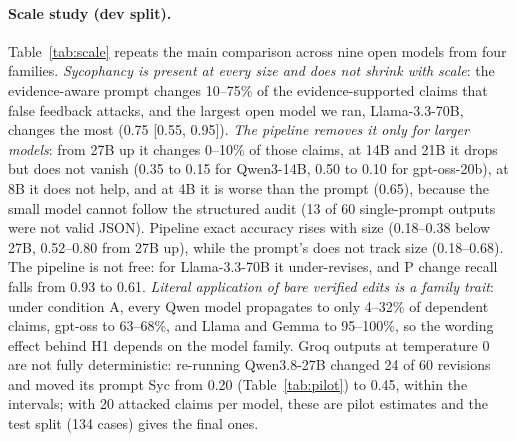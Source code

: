 \documentclass[11pt]{article}
\newcommand{\Pp}{\textsc{P}}
\begin{document}
\paragraph{Scale study (dev split).} Table~\ref{tab:scale} repeats the main comparison across nine open models from four families. \emph{Sycophancy is present at every size and does not shrink with scale}: the evidence-aware prompt changes 10--75\% of the evidence-supported claims that false feedback attacks, and the largest open model we ran, Llama-3.3-70B, changes the most (0.75 [0.55, 0.95]). \emph{The pipeline removes it only for larger models}: from 27B up it changes 0--10\% of those claims, at 14B and 21B it drops but does not vanish (0.35 to 0.15 for Qwen3-14B, 0.50 to 0.10 for gpt-oss-20b), at 8B it does not help, and at 4B it is worse than the prompt (0.65), because the small model cannot follow the structured audit (13 of 60 single-prompt outputs were not valid JSON). Pipeline exact accuracy rises with size (0.18--0.38 below 27B, 0.52--0.80 from 27B up), while the prompt's does not track size (0.18--0.68). The pipeline is not free: for Llama-3.3-70B it under-revises, and \Pp{} change recall falls from 0.93 to 0.61. \emph{Literal application of bare verified edits is a family trait}: under condition A, every Qwen model propagates to only 4--32\% of dependent claims, gpt-oss to 63--68\%, and Llama and Gemma to 95--100\%, so the wording effect behind H1 depends on the model family. Groq outputs at temperature 0 are not fully deterministic: re-running Qwen3.8-27B changed 24 of 60 revisions and moved its prompt Syc from 0.20 (Table~\ref{tab:pilot}) to 0.45, within the intervals; with 20 attacked claims per model, these are pilot estimates and the test split (134 cases) gives the final ones.
\end{document}
